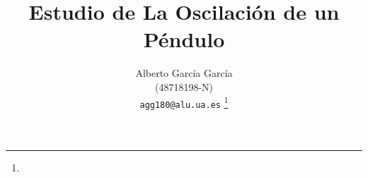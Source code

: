 \documentclass[journal]{IEEEtran}
\begin{document}
%
\title{Estudio de La Oscilación de un Péndulo}
%
%
%

\author{Alberto García García\\ (48718198-N)\\ \texttt{agg180@alu.ua.es} %
\thanks{}%
}

% 
%



%
{}
% 
\end{document}
